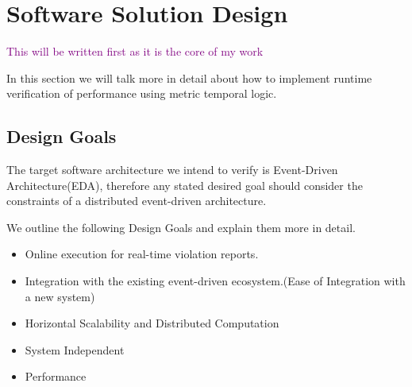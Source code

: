 \documentclass[twocolumn]{article}
\newcommand{\note}[1] {
	\textcolor{Purple}{#1}

}
\begin{document}
\section{Software Solution Design}
\note{This will be written first as it is the core of my work}
In this section we will talk more in detail about how to implement runtime verification of performance using metric temporal logic.

\subsection{Design Goals}
The target software architecture we intend to verify is Event-Driven Architecture(EDA), therefore any stated desired goal
should consider the constraints of a distributed event-driven architecture.

We outline the following Design Goals and explain them more in detail.

\begin{itemize}
	\item Online execution for real-time violation reports.
	\item Integration with the existing event-driven ecosystem.(Ease of Integration with a new system)
	\item Horizontal Scalability and Distributed Computation
	\item System Independent
	\item Performance
\end{itemize}
\end{document}
